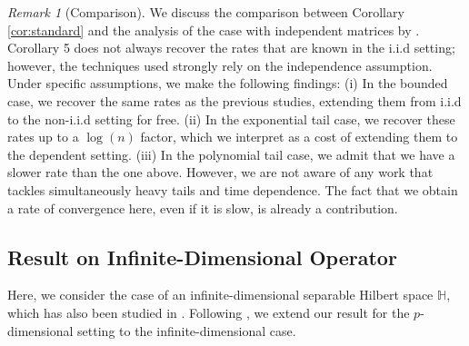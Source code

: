 \documentclass[11pt,a4paper]{article}
\theoremstyle{remark}
\newtheorem{remark}{Remark}
\theoremstyle{definition}
\theoremstyle{definition}
\newcommand{\rc}{\color{black}}
\begin{document}
\begin{bibunit}[apalike]
\begin{remark}[Comparison]
    We discuss the comparison between Corollary \ref{cor:standard} and the analysis of the case with independent matrices by \cite{zhivotovskiy2021dimension,abdalla2022covariance}.
    Corollary 5 does not always recover the rates that are known in the i.i.d setting; however, the techniques used \cite{zhivotovskiy2021dimension,abdalla2022covariance} strongly rely on the independence assumption.
    Under specific assumptions, we make the following findings: 
    (i) In the bounded case, we recover the same rates as the previous studies, extending them from i.i.d to the non-i.i.d setting for free.
    (ii) In the exponential tail case, we recover these rates up to a $\log(n)$ factor, which we interpret as a cost of extending them to the dependent setting.
    (iii) In the polynomial tail case, we admit that we have a slower rate {\rc than the one above}. However, we are not aware of any work that tackles simultaneously heavy tails and time dependence. The fact that we obtain a rate of convergence here, even if it is slow, is already a contribution.
\end{remark}



\subsection{Result on Infinite-Dimensional Operator}
Here, we consider the case of an infinite-dimensional separable Hilbert space $\mathbb{H}$, which has also been studied in \citep{koltchinskii2017concentration,giulini2018robust}.
Following \citep{giulini2018robust}, we extend our result for the $p$-dimensional setting to the infinite-dimensional case.



\end{bibunit}
\end{document}
